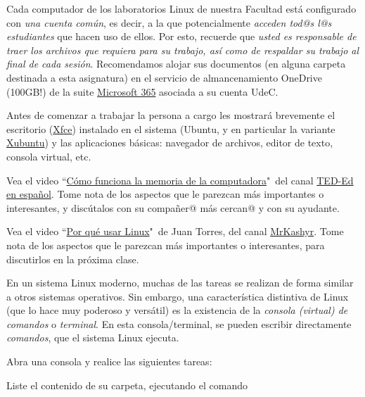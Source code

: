 \documentclass[11pt]{exam}
\begin{document}
\begin{questions}

\item Cada computador de los laboratorios Linux de nuestra Facultad está configurado con \textit{una cuenta común}, es decir, a la que potencialmente \textit{acceden tod@s l@s estudiantes} que hacen uso de ellos. Por esto, recuerde que \textit{usted es responsable de traer los archivos que requiera para su trabajo, así como de respaldar su trabajo al final de cada sesión}. Recomendamos alojar sus documentos (en alguna carpeta destinada a esta asignatura) en el servicio de almancenamiento OneDrive (100GB!) de la suite \href{https://www.office.com/}{Microsoft 365} asociada a su cuenta UdeC.

\item Antes de comenzar a trabajar la persona a cargo les mostrar\'a brevemente
el escritorio (\href{http://www.xfce.org/?lang=es}{Xfce}) instalado en el sistema (Ubuntu, y en particular la variante \href{http://xubuntu.org/}{Xubuntu}) y las aplicaciones b\'asicas: navegador de archivos, editor de texto, consola virtual, etc.

\item Vea el video ``\href{https://youtu.be/Sq3OjI3tVIM}{Cómo funciona la memoria de la computadora}"\, del canal \href{https://www.youtube.com/@TEDEdEspanol}{TED-Ed en español}. Tome nota de los aspectos que le parezcan más importantes o interesantes, y discútalos con su compañer@ más cercan@ y con su ayudante.

\item Vea el video ``\href{https://youtu.be/p6rSvMrOpeo}{Por qué usar Linux}"\, de Juan Torres, del canal \href{https://www.youtube.com/channel/UCk5zxKnvQkKdmLJzh-E6tKA}{MrKashyr}. Tome nota de los aspectos que le parezcan más importantes o interesantes, para discutirlos en la próxima clase.


\item En un sistema Linux moderno, muchas de las tareas se realizan de forma similar a otros sistemas operativos. Sin embargo, una característica distintiva de Linux (que lo hace muy poderoso y versátil) es la existencia de la \textit{consola (virtual) de comandos} o \textit{terminal}. En esta consola/terminal, se pueden escribir directamente \textit{comandos}, que el sistema Linux ejecuta. 

Abra una consola y realice las siguientes tareas:
\begin{parts}
\item Liste el contenido de su carpeta, ejecutando el comando 


\end{parts}
\end{questions}
\end{document}
